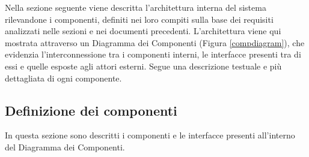 \documentclass[11pt, a4paper]{article}
\theoremstyle{definition} %
\begin{document}


Nella sezione seguente viene descritta l'architettura interna del sistema
rilevandone i componenti, definiti nei loro compiti sulla base dei requisiti
analizzati nelle sezioni e nei documenti precedenti. L'architettura viene
qui mostrata attraverso un Diagramma dei Componenti (Figura \ref{compdiagram}), che evidenzia
l'interconnessione tra i componenti interni, le interfacce presenti tra di
essi e quelle esposte agli attori esterni. Segue una descrizione testuale
e più dettagliata di ogni componente.


\subsection{Definizione dei componenti}
In questa sezione sono descritti i componenti e le interfacce presenti
all'interno del Diagramma dei Componenti.

\iffalse
\end{document}
